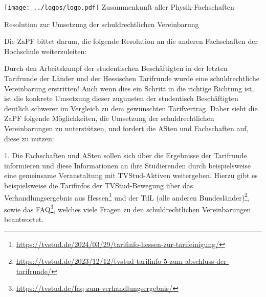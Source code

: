 \documentclass[DIV=calc]{scrartcl}
\begin{document}
\hspace{0.87\textwidth}
\begin{minipage}{120pt}
	\vspace{-1.8cm}
	\texttt{[image: ../logos/logo.pdf]}
	\centering
	\small Zusammenkunft aller Physik-Fachschaften
\end{minipage}

\begin{center}
  \huge{Resolution zur Umsetzung der schuldrechtlichen Vereinbarung}\vspace{.25\baselineskip}\\
  \normalsize
\end{center}
\vspace{1cm}







Die ZaPF bittet darum, die folgende Resolution an die anderen Fachschaften der Hochschule weiterzuleiten:

Durch den Arbeitskampf der studentischen Beschäftigten in der letzten Tarifrunde der Länder und der Hessischen Tarifrunde wurde eine schuldrechtliche Vereinbarung erstritten! Auch wenn dies ein Schritt in die richtige Richtung ist, ist die konkrete Umsetzung dieser zugunsten der studentisch Beschäftigten deutlich schwerer im Vergleich zu dem gewünschten Tarifvertrag. Daher sieht die ZaPF folgende Möglichkeiten, die Umsetzung der schuldrechtlichen Vereinbarungen zu unterstützen, und fordert die ASten und Fachschaften auf, diese zu nutzen:

1. Die Fachschaften und ASten sollen sich über die Ergebnisse der Tarifrunde informieren und diese Informationen an ihre Studierenden durch beispielsweise eine gemeinsame Veranstaltung mit TVStud-Aktiven weitergeben. Hierzu gibt es beispielsweise die Tarifinfos der TVStud-Bewegung über das Verhandlungsergebnis aus Hessen\footnote{\url{https://tvstud.de/2024/03/29/tarifinfo-hessen-zur-tarifeinigung/}} und der TdL (alle anderen Bundesländer)\footnote{\url{https://tvstud.de/2023/12/12/tvstud-tarifinfo-5-zum-abschluss-der-tarifrunde/}}, sowie das FAQ\footnote{\url{https://tvstud.de/faq-zum-verhandlungsergebnis/}}, welches viele Fragen zu den schuldrechtlichen Vereinbarungen beantwortet.
\end{document}
